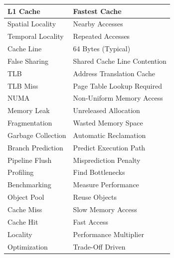\begin{center}
\begin{tabular}{|p{5cm}|p{8cm}|}
\hline
L1 Cache & Fastest Cache \\
\hline
Spatial Locality & Nearby Accesses \\
\hline
Temporal Locality & Repeated Accesses \\
\hline
Cache Line & 64 Bytes (Typical) \\
\hline
False Sharing & Shared Cache Line Contention \\
\hline
TLB & Address Translation Cache \\
\hline
TLB Miss & Page Table Lookup Required \\
\hline
NUMA & Non-Uniform Memory Access \\
\hline
Memory Leak & Unreleased Allocation \\
\hline
Fragmentation & Wasted Memory Space \\
\hline
Garbage Collection & Automatic Reclamation \\
\hline
Branch Prediction & Predict Execution Path \\
\hline
Pipeline Flush & Misprediction Penalty \\
\hline
Profiling & Find Bottlenecks \\
\hline
Benchmarking & Measure Performance \\
\hline
Object Pool & Reuse Objects \\
\hline
Cache Miss & Slow Memory Access \\
\hline
Cache Hit & Fast Access \\
\hline
Locality & Performance Multiplier \\
\hline
Optimization & Trade-Off Driven \\
\hline
\end{tabular}
\end{center}